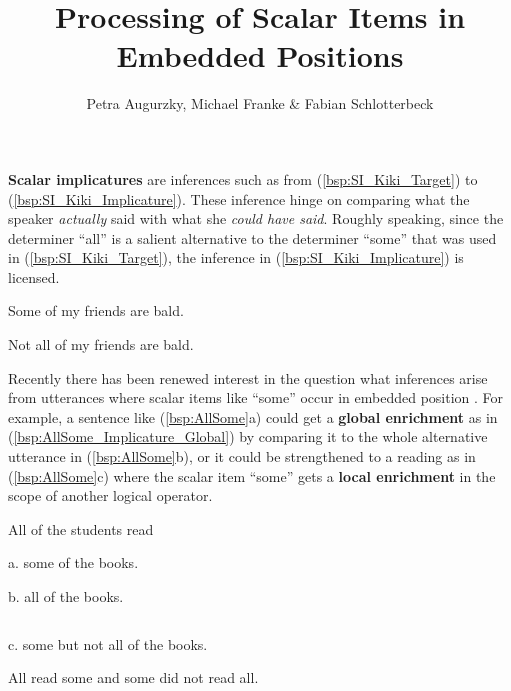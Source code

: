 \documentclass[fleqn,reqno,10pt]{article}
\title{Processing of Scalar Items in Embedded Positions}
\author{Petra Augurzky, Michael Franke \& Fabian Schlotterbeck}
\date{}
\begin{document}
\maketitle

\textbf{Scalar implicatures} are inferences such as from
(\ref{bsp:SI_Kiki_Target}) to (\ref{bsp:SI_Kiki_Implicature}). These
inference hinge on comparing what the speaker \emph{actually} said
with what she \emph{could have said}. Roughly speaking, since the
determiner ``all'' is a salient alternative to the determiner ``some''
that was used in (\ref{bsp:SI_Kiki_Target}), the inference in
(\ref{bsp:SI_Kiki_Implicature}) is licensed.

\noindent \begin{minipage}{0.5\linewidth}
  \begin{exe}
  \ex  \label{bsp:SI_Kiki_Target} Some of my friends are
    bald.
  \end{exe}
\end{minipage}
\begin{minipage}{0.5\linewidth}
  \begin{exe}
  \ex  \label{bsp:SI_Kiki_Implicature} Not all of my friends are
    bald.
  \end{exe}
\end{minipage}

\noindent Recently there has been renewed interest in the question
what inferences arise from utterances where scalar items like ``some''
occur in embedded position
\citep[cf.][]{Cohen1971:Some-Remarks-on,Landman1998:Plurals-and-Max,Chierchia:2004_ScalarImplicatures,Magri2009:A-Theory-of-Ind}. For
example, a sentence like (\ref{bsp:AllSome}a) could get a \textbf{global
enrichment} as in (\ref{bsp:AllSome_Implicature_Global}) by comparing it to the whole alternative utterance in
(\ref{bsp:AllSome}b), or it could be strengthened to a reading as in
(\ref{bsp:AllSome}c) where the scalar item ``some'' gets a \textbf{local
enrichment} in the scope of another logical operator. 
\noindent \begin{minipage}{0.4\linewidth}
\begin{exe}
\ex \label{bsp:AllSome} All of the students read
\end{exe}
\end{minipage}
\begin{minipage}{0.3\linewidth}
  a. some of the books.
\end{minipage}
\begin{minipage}{0.3\linewidth}
  b. all of the books.
\end{minipage}
\noindent \begin{minipage}{0.4\linewidth}
 $ $ 
\end{minipage}
\begin{minipage}{0.6\linewidth}
  c. some but not all of the books.
\end{minipage}
\begin{minipage}{1.0\linewidth}
  \begin{exe}
  \ex \label{bsp:AllSome_Implicature_Global} All read some and some did
    not read all. 
  \end{exe}
\end{minipage}
\end{document}

